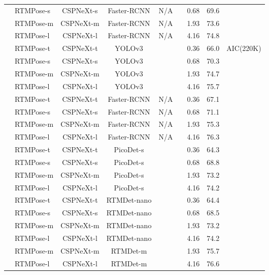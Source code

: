 \documentclass[final]{cvpr}
\begin{document}
{\begin{table*}[h]
\begin{center}
{\begin{tabular}{c|l|c|c|c|c|c|c|c}
            & RTMPose-s & CSPNeXt-s & Faster-RCNN  & N/A &  & 0.68 & 69.6 \\ 
            & RTMPose-m & CSPNeXt-m & Faster-RCNN  & N/A &  & 1.93 & 73.6 \\ 
            & RTMPose-l & CSPNeXt-l & Faster-RCNN  & N/A &  & 4.16 & 74.8 \\ 
            \cmidrule{2-9}
            & RTMPose-t & CSPNeXt-t & YOLOv3 &  &  & 0.36 & 66.0&\multirow{18}{*}{AIC(220K)} \\ 
            & RTMPose-s & CSPNeXt-s & YOLOv3 &  &  & 0.68 & 70.3 \\ 
            & RTMPose-m & CSPNeXt-m & YOLOv3 &  &  & 1.93 & 74.7 \\ 
            & RTMPose-l & CSPNeXt-l & YOLOv3 &  &  & 4.16 & 75.7 \\ 
            \cmidrule{2-8}
            & RTMPose-t & CSPNeXt-t & Faster-RCNN & N/A &  & 0.36 & 67.1 \\ 
            & RTMPose-s & CSPNeXt-s & Faster-RCNN & N/A &  & 0.68 & 71.1 \\ 
            & RTMPose-m & CSPNeXt-m & Faster-RCNN & N/A &  & 1.93 & 75.3 \\ 
            & RTMPose-l & CSPNeXt-l & Faster-RCNN & N/A &  & 4.16 & 76.3 \\ 
            \cmidrule{2-8}
            & RTMPose-t & CSPNeXt-t & PicoDet-s &  &  & 0.36 & 64.3 \\ 
            & RTMPose-s & CSPNeXt-s & PicoDet-s &  &  & 0.68 & 68.8 \\ 
            & RTMPose-m & CSPNeXt-m & PicoDet-s &  &  & 1.93 & 73.2 \\ 
            & RTMPose-l & CSPNeXt-l & PicoDet-s &  &  & 4.16 & 74.2 \\ 
            \cmidrule{2-8}
            & RTMPose-t & CSPNeXt-t & RTMDet-nano &  &  & 0.36 & 64.4 \\ 
            & RTMPose-s & CSPNeXt-s & RTMDet-nano &  &  & 0.68 & 68.5 \\ 
            & RTMPose-m & CSPNeXt-m & RTMDet-nano &  &  & 1.93 & 73.2 \\ 
            & RTMPose-l & CSPNeXt-l & RTMDet-nano &  &  & 4.16 & 74.2 \\ 
            & RTMPose-m & CSPNeXt-m & RTMDet-m &  &  & 1.93 & 75.7 \\ 
            & RTMPose-l & CSPNeXt-l & RTMDet-m &  &  & 4.16 & 76.6 \\ 
			\bottomrule
		\end{tabular}
	}
	\end{center}
\end{table*}

}
\end{document}
